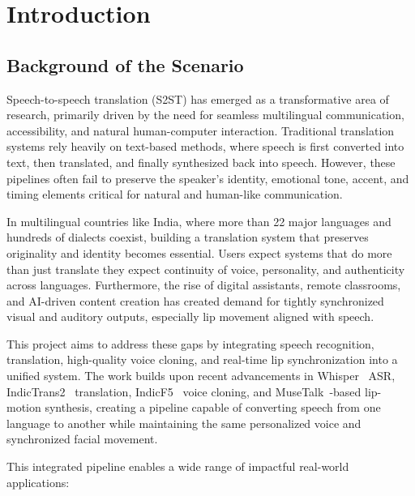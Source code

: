 \documentclass[12pt,oneside]{report}
\begin{document}

\chapter{Introduction}
\label{ch:intro}

\section{Background of the Scenario}

Speech-to-speech translation (S2ST) has emerged as a transformative area of research, primarily driven by the need for seamless multilingual communication, accessibility, and natural human-computer interaction. Traditional translation systems rely heavily on text-based methods, where speech is first converted into text, then translated, and finally synthesized back into speech. However, these pipelines often fail to preserve the speaker's identity, emotional tone, accent, and timing elements critical for natural and human-like communication.

In multilingual countries like India, where more than 22 major languages and hundreds of dialects coexist, building a translation system that preserves originality and identity becomes essential. Users expect systems that do more than just translate they expect continuity of voice, personality, and authenticity across languages. Furthermore, the rise of digital assistants, remote classrooms, and AI-driven content creation has created demand for tightly synchronized visual and auditory outputs, especially lip movement aligned with speech.

This project aims to address these gaps by integrating speech recognition, translation, high-quality voice cloning, and real-time lip synchronization into a unified system. The work builds upon recent advancements in Whisper~\cite{radford2023whisper} ASR, IndicTrans2~\cite{gala2023indictrans2} translation, IndicF5~\cite{indicf5_2025} voice cloning, and MuseTalk~\cite{zhang2023musetalk}-based lip-motion synthesis, creating a pipeline capable of converting speech from one language to another while maintaining the same personalized voice and synchronized facial movement.

This integrated pipeline enables a wide range of impactful real-world applications:
\end{document}
